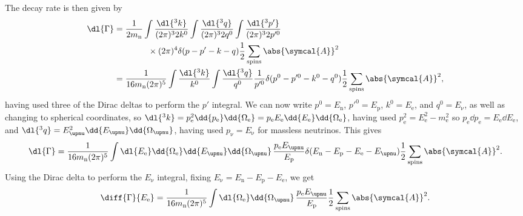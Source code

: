 \documentclass[fleqn]{NotesClass}
\newcommand{\Pparticle}[1]{\mathrm{#1}}
\newcommand{\Pex}{\ensuremath{\Pparticle{e}}}
\newcommand{\Pnu}{\ensuremath{\upnu}}
\newcommand{\Pp}{\ensuremath{\Pparticle{p}}}
\newcommand{\Pn}{\ensuremath{\Pparticle{n}}}
\newcommand{\amplitude}{\symcal{A}}
\begin{document}
    The decay rate is then given by
    \begin{align}
        \dl{\Gamma}
        &= \frac{1}{2m_{\Pn}} \int \frac{\dl{^3k}}{(2\pi)^3 2k^0} \int \frac{\dl{^3q}}{(2\pi)^3 2q^0} \int \frac{\dl{^3p'}}{(2\pi)^3 2p'^0}\\
        &\qquad\qquad\times(2\pi)^4 \delta(p - p' - k - q) \frac{1}{2} \sum_{\text{spins}} \abs{\amplitude}^2\\
        &= \frac{1}{16m_{\Pn}(2\pi)^5} \int \frac{\dl{^3k}}{k^0} \int \frac{\dl{^3q}}{q^0} \frac{1}{p'^0} \delta(p^0 - p'^0 - k^0 - q^0) \frac{1}{2}\sum_{\text{spins}} \abs{\amplitude}^2,
    \end{align}
    having used three of the Dirac deltas to perform the \(p'\) integral.
    We can now write \(p^0 = E_{\Pn}\), \(p'^0 = E_{\Pp}\), \(k^0 = E_{\Pex}\), and \(q^0 = E_{\Pnu}\), as well as changing to spherical coordinates, so \(\dl{^3k} = p_{\Pex}^2 \dd{p_{\Pex}} \dd{\Omega_{\Pex}} = p_{\Pex}E_{\Pex} \dd{E_{\Pex}} \dd{\Omega_{\Pex}}\), having used \(p_{\Pex}^2 = E_{\Pex}^2 - m_{\Pex}^2\) so \(p_{\Pex} \dd{p_{\Pex}} = E_{\Pex} \dd{E_{\Pex}}\), and \(\dl{^3q} = E_{\Pnu}^2 \dd{E_{\Pnu}} \dd{\Omega_{\Pnu}}\), having used \(p_{\Pnu} = E_{\Pnu}\) for massless neutrinos.
    This gives
    \begin{equation*}
        \dl{\Gamma} = \frac{1}{16m_{\Pn}(2\pi)^5} \int \dl{E_{\Pex}} \dd{\Omega_{\Pex}} \dd{E_{\Pnu}} \dd{\Omega_{\Pnu}} \, \frac{p_{\Pex}E_{\Pnu}}{E_{\Pp}} \delta(E_{\Pn} - E_{\Pp} - E_{\Pex} - E_{\Pnu}) \frac{1}{2}\sum_{\text{spins}} \abs{\amplitude}^2.
    \end{equation*}
    Using the Dirac delta to perform the \(E_{\Pnu}\) integral, fixing \(E_{\Pnu} = E_{\Pn} - E_{\Pp} - E_{\Pex}\), we get
    \begin{equation}
        \diff{\Gamma}{E_{\Pex}} = \frac{1}{16m_{\Pn}(2\pi)^5} \int \dl{\Omega_{\Pex}} \dd{\Omega_{\Pnu}} \, \frac{p_{\Pex}E_{\Pnu}}{E_{\Pp}} \frac{1}{2}\sum_{\text{spins}}\abs{\amplitude}^2.
    \end{equation}
    
\end{document}
